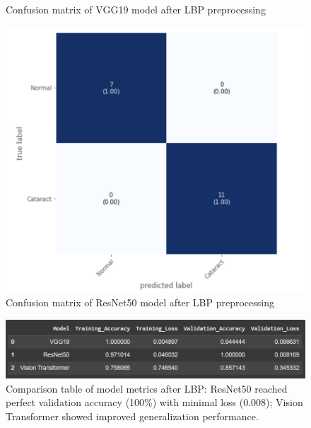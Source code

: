\documentclass{ijclclp}
\begin{document}
\begin{flushleft}
\begin{figure}[htbp]
\begin{minipage}[b]{0.48\textwidth}
    \caption{Confusion matrix of VGG19 model after LBP preprocessing}
    \end{minipage}
    \hfill
    \begin{minipage}[b]{0.48\textwidth}
    \includegraphics[width=\textwidth]{resnet50_confusion.png}
    \caption{Confusion matrix of ResNet50 model after LBP preprocessing}
    \end{minipage}
\end{figure}


\begin{figure}[htbp]
    \centering
    \includegraphics[width=1\textwidth]{image17.png}
    \caption{Comparison table of model metrics after LBP: ResNet50 reached perfect validation accuracy (100\%) with minimal loss (0.008); Vision Transformer showed improved generalization performance.}
    \label{fig:comparison_after_lbp}
\end{figure}


\end{flushleft}
\end{document}
